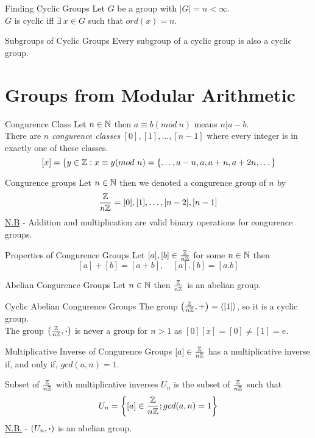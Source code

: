 \documentclass[11pt,a4paper]{article}
\begin{document}
\subtitle{Theorem 7.05 - }{Finding Cyclic Groups}
Let $G$ be a group with $|G| = n < \infty$.\\
$G$ is cyclic iff $\exists\ x \in G$ such that $ord(x) = n$.\\

\subtitle{Theorem 7.06 - }{Subgroups of Cyclic Groups}
Every subgroup of a cyclic group is also a cyclic group.

\section{Groups from Modular Arithmetic}

\subtitle{Definition 8.01 - }{Congurence Class}
Let $n \in \mathbb{N}$ then $a \equiv b (mod\ n)$ means $n | a - b$.\\
There are $n$ \textit{congurence classes} $[0], [1], \dots , [n-1]$ where every integer is in exactly one of these classes.
$$[x] = \{y \in \mathbb{Z} : x \equiv y (mod\ n) = \{ \dots , a-n , a , a+n , a+2n , \dots\}$$

\subtitle{Definition 8.02 - }{Congurence groups}
Let $n \in \mathbb{N}$ then we denoted a congurence group of $n$ by
$$\frac{\mathbb{Z}}{n\mathbb{Z}} = {[0], [1] , \dots , [n-2] , [n-1]}$$
\underline{N.B} - Addition and multiplication are valid binary operations for congurence groups.\\

\subtitle{Definition 8.03 - }{Properties of Congurence Groups}
Let $[a], [b] \in \frac{\mathbb{Z}}{n\mathbb{Z}}$ for some $n \in \mathbb{N}$ then
$$[a] + [b] = [a + b],\quad [a].[b] = [a.b]$$

\subtitle{Theorem 8.04 - }{Abelian Congurence Groups}
Let $n \in \mathbb{N}$ then $\frac{\mathbb{Z}}{n\mathbb{Z}}$ is an abelian group.\\

\subtitle{Theorem 8.05 - }{Cyclic Abelian Congurence Groups}
The group $\left( \frac{\mathbb{Z}}{n\mathbb{Z}}, + \right) = \langle [1] \rangle$, so it is a cyclic group.\\
The group $\left( \frac{\mathbb{Z}}{n\mathbb{Z}}, \boldsymbol{\cdot} \right)$ is never a group for $n > 1$ as $[0][x] = [0] \not = [1] = e$.\\

\subtitle{Theorem 8.06 - }{Multiplicative Inverse of Congurence Groups}
$[a] \in \frac{\mathbb{Z}}{n\mathbb{Z}}$ has a multiplicative inverse if, and only if, $gcd(a, n) = 1$.\\

\subtitle{Definition 8.07 - }{Subset of $\frac{\mathbb{Z}}{n\mathbb{Z}}$ with multiplicative inverses}
$U_n$ is the subset of $\frac{\mathbb{Z}}{n\mathbb{Z}}$ such that
$$U_n = \left\{ [a] \in \frac{\mathbb{Z}}{n\mathbb{Z}}; gcd(a, n) = 1 \right\}$$
\underline{N.B.} - $(U_n, \boldsymbol{\cdot})$ is an abelian group.
\end{document}
